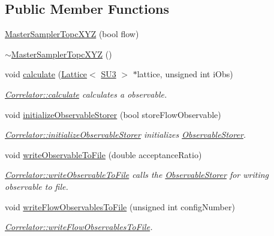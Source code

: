 \subsection*{Public Member Functions}
\begin{DoxyCompactItemize}
\item 
\mbox{\hyperlink{class_master_sampler_topc_x_y_z_ad8ba8f2c50c66d823c551f71fd62a99b}{Master\+Sampler\+Topc\+X\+YZ}} (bool flow)
\item 
\mbox{\hyperlink{class_master_sampler_topc_x_y_z_a7e896952c909a1f29f97e0ef4c52d348}{$\sim$\+Master\+Sampler\+Topc\+X\+YZ}} ()
\item 
void \mbox{\hyperlink{class_master_sampler_topc_x_y_z_a0ea80ad9935db791f00461b7dfd548b7}{calculate}} (\mbox{\hyperlink{class_lattice}{Lattice}}$<$ \mbox{\hyperlink{class_s_u3}{S\+U3}} $>$ $\ast$lattice, unsigned int i\+Obs)
\begin{DoxyCompactList}\small\item\em \mbox{\hyperlink{class_correlator_ab33502ff305f891c5c2e6d66a26a0247}{Correlator\+::calculate}} calculates a observable. \end{DoxyCompactList}\item 
void \mbox{\hyperlink{class_master_sampler_topc_x_y_z_af6d2cf2023d9626908fd26b07a7a0b84}{initialize\+Observable\+Storer}} (bool store\+Flow\+Observable)
\begin{DoxyCompactList}\small\item\em \mbox{\hyperlink{class_correlator_ab99886c09dd27dfc8676d0032cecf9bc}{Correlator\+::initialize\+Observable\+Storer}} initializes \mbox{\hyperlink{class_observable_storer}{Observable\+Storer}}. \end{DoxyCompactList}\item 
void \mbox{\hyperlink{class_master_sampler_topc_x_y_z_a930f13a2a13f4b3820f40c8b52110cf2}{write\+Observable\+To\+File}} (double acceptance\+Ratio)
\begin{DoxyCompactList}\small\item\em \mbox{\hyperlink{class_correlator_a9e8d80e30e4fbe3b7fe57521538cb5ff}{Correlator\+::write\+Observable\+To\+File}} calls the \mbox{\hyperlink{class_observable_storer}{Observable\+Storer}} for writing observable to file. \end{DoxyCompactList}\item 
void \mbox{\hyperlink{class_master_sampler_topc_x_y_z_a4fba4290e4406e18ef3f2904c6ae364f}{write\+Flow\+Observables\+To\+File}} (unsigned int config\+Number)
\begin{DoxyCompactList}\small\item\em \mbox{\hyperlink{class_correlator_a168512b2ce182d9478db47f100125fa6}{Correlator\+::write\+Flow\+Observables\+To\+File}}. \end{DoxyCompactList}\item 

\end{DoxyCompactItemize}
